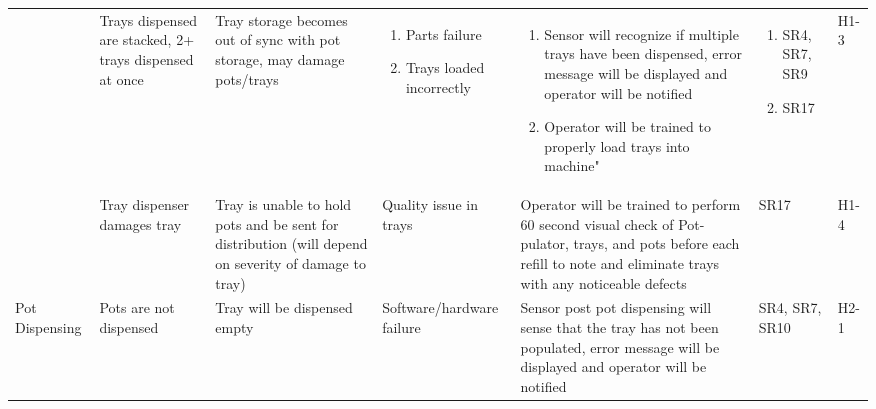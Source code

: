 \documentclass{article}
\begin{document}
\begin{landscape}
\begin{center}
\begin{longtable}{|l|  p{3cm}  p{4cm}  p{3cm}  p{4cm}  p{2cm}  p{1cm}|}
        &
        Trays dispensed are stacked, 2+ trays dispensed at once&
        Tray storage becomes out of sync with pot storage, may damage pots/trays&
        \begin{enumerate}[label=(\alph*)]
            \item Parts failure 
            \item Trays loaded incorrectly
        \end{enumerate} &
        \begin{enumerate}[label=(\alph*)]
            \item Sensor will recognize if multiple trays have been dispensed, error message will be displayed and operator will be notified
            \item Operator will be trained to properly load trays into machine"	
        \end{enumerate}&
        \begin{enumerate}[label=(\alph*)]
            \item SR4, SR7, SR9
            \item SR17
        \end{enumerate}&
        H1-3\\
        &
        Tray dispenser damages tray&	
        Tray is unable to hold pots and be sent for distribution (will depend on severity of damage to tray)&
        Quality issue in trays&
        Operator will be trained to perform 60 second visual check of Pot-pulator, trays, and pots before each refill to note and eliminate trays with any noticeable defects&		
        SR17&
        H1-4\\
        \hline
        Pot Dispensing&
        Pots are not dispensed&
        Tray will be dispensed empty&
        Software/hardware failure&
        Sensor post pot dispensing will sense that the tray has not been populated, error message will be displayed and operator will be notified&		
        SR4, SR7, SR10&
        H2-1\\


\end{longtable}
\end{center}
\end{landscape}
\end{document}
